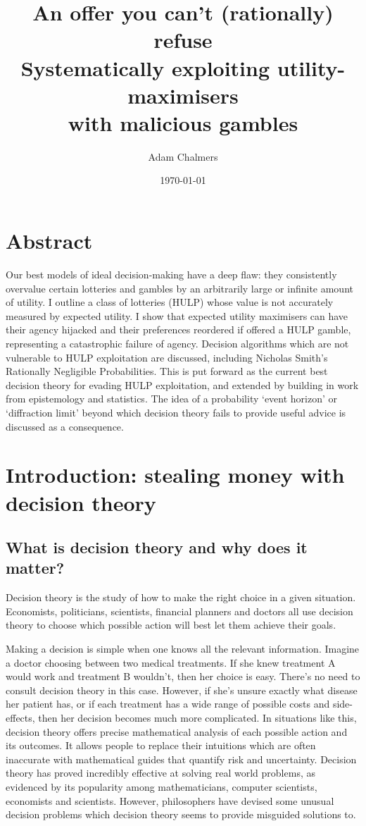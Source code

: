 \documentclass{article}
\title{%
  An offer you can't (rationally) refuse \\
  \large Systematically exploiting utility-maximisers \\
    with malicious gambles}
\author{Adam Chalmers}
\date{\today}
\begin{document}
\frenchspacing
\onehalfspacing
\maketitle

\section{Abstract}
Our best models of ideal decision-making have a deep flaw: they consistently overvalue certain lotteries and gambles by an arbitrarily large or infinite amount of utility. I outline a class of lotteries (HULP) whose value is not accurately measured by expected utility. I show that expected utility maximisers can have their agency hijacked and their preferences reordered if offered a HULP gamble, representing a catastrophic failure of agency. Decision algorithms which are not vulnerable to HULP exploitation are discussed, including Nicholas Smith's Rationally Negligible Probabilities. This is put forward as the current best decision theory for evading HULP exploitation, and extended by building in work from epistemology and statistics. The idea of a probability `event horizon' or `diffraction limit' beyond which decision theory fails to provide useful advice is discussed as a consequence.

\section{Introduction: stealing money with decision theory}
\subsection{What is decision theory and why does it matter?}

Decision theory is the study of how to make the right choice in a given situation. Economists, politicians, scientists, financial planners and doctors all use decision theory to choose which possible action will best let them achieve their goals.

Making a decision is simple when one knows all the relevant information. Imagine a doctor choosing between two medical treatments. If she knew treatment A would work and treatment B wouldn't, then her choice is easy. There's no need to consult decision theory in this case. However, if she's unsure exactly what disease her patient has, or if each treatment has a wide range of possible costs and side-effects, then her decision becomes much more complicated. In situations like this, decision theory offers precise mathematical analysis of each possible action and its outcomes. It allows people to replace their intuitions \textemdash{} which are often inaccurate \textemdash{} with mathematical guides that quantify risk and uncertainty. Decision theory has proved incredibly effective at solving real world problems, as evidenced by its popularity among mathematicians, computer scientists, economists and scientists. However, philosophers have devised some unusual decision problems which decision theory seems to provide misguided solutions to. 
\end{document}
